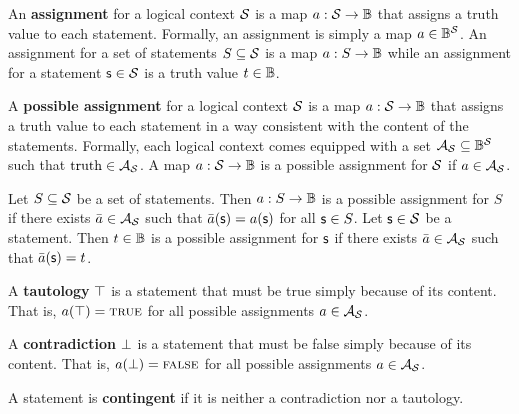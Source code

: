 \documentclass[11pt,letterpaper,fleqn]{memoir} %
\begin{document}
\begin{mathSection}
\begin{defn}
	An \textbf{assignment} for a logical context $\mathcal{S}$ is a map $a : \mathcal{S} \to \mathbb{B}$ that assigns a truth value to each statement. Formally, an assignment is simply a map $a \in \mathbb{B}^{\mathcal{S}}$. An assignment for a set of statements $S \subseteq \mathcal{S}$ is a map $a : S \to \mathbb{B}$ while an assignment for a statement $\mathsf{s} \in \mathcal{S}$ is a truth value $t \in \mathbb{B}$.
\end{defn}

\begin{axiom}\label{ax_possible_assignemetns}
	A \textbf{possible assignment} for a logical context $\mathcal{S}$ is a map $a : \mathcal{S} \to \mathbb{B}$ that assigns a truth value to each statement in a way consistent with the content of the statements. Formally, each logical context comes equipped with a set $\mathcal{A}_{\mathcal{S}} \subseteq \mathbb{B}^{\mathcal{S}}$ such that $\operatorname{truth} \in \mathcal{A}_{\mathcal{S}}$. A map $a : \mathcal{S} \to \mathbb{B}$ is a possible assignment for $\mathcal{S}$ if $a \in \mathcal{A}_{\mathcal{S}}$.
\end{axiom}

\begin{defn}
	Let $S \subseteq \mathcal{S}$ be a set of statements. Then $a : S \to \mathbb{B}$ is a possible assignment for $S$ if there exists $\bar{a} \in \mathcal{A}_{\mathcal{S}}$ such that $\bar{a}(\mathsf{s}) = a(\mathsf{s})$ for all $\mathsf{s} \in S$. Let $\mathsf{s} \in \mathcal{S}$ be a statement. Then $t \in \mathbb{B}$ is a possible assignment for $\mathsf{s}$ if there exists $\bar{a} \in \mathcal{A}_{\mathcal{S}}$ such that $\bar{a}(\mathsf{s}) = t$.
\end{defn}

\begin{defn}
	A \textbf{tautology} $\top$ is a statement that must be true simply because of its content. That is, $a(\top) = \textsc{true}$ for all possible assignments $a \in \mathcal{A}_{\mathcal{S}}$.
\end{defn}

\begin{defn}
	A \textbf{contradiction} $\bot$ is a statement that must be false simply because of its content. That is, $a(\bot) = \textsc{false}$ for all possible assignments $a \in \mathcal{A}_{\mathcal{S}}$.
\end{defn}
	
\begin{defn}
	A statement is \textbf{contingent} if it is neither a contradiction nor a tautology.
\end{defn}

\end{mathSection}
\end{document}

